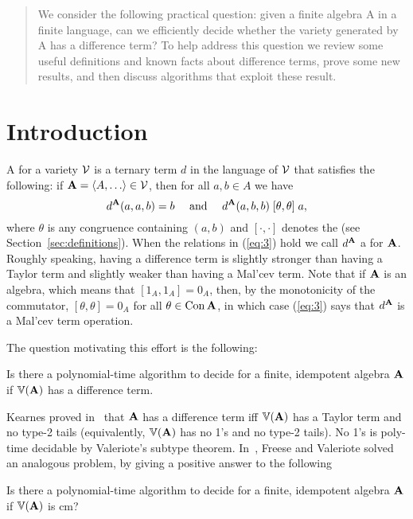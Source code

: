 \begin{abstract}
We consider the following practical question: given a finite algebra A in a
finite language, can we efficiently decide whether the variety generated by A
has a difference term? To help address this question we review some useful definitions
and known facts about difference terms, prove some new results, and then
discuss algorithms that exploit these result. 
\end{abstract}

\section{Introduction}
\label{sec:introduction}

A  for a variety $\mathcal{V}$ is a ternary term $d$ in the
language of $\mathcal{V}$ that satisfies the following:
if $\bA = \<A, \dots \> \in \sV$, then for all $a, b \in A$ we have
\begin{equation}
\label{eq:3}  
d^{\mathbf{A}}(a,a,b) = b \quad \text{ and } \quad
d^{\mathbf{A}}(a,b,b) \mathrel{[\theta, \theta]} a,
\end{equation}
where $\theta$ is any congruence %
containing $(a,b)$
and $[\cdot, \cdot]$ denotes the 
(see Section~\ref{sec:definitions}). %
When the relations in (\ref{eq:3}) hold we call $d^{\mathbf{A}}$
a  for $\mathbf{A}$.
Roughly speaking, having a difference term is slightly stronger than having
a Taylor term and slightly weaker than having a Mal'cev term.  Note that if
$\mathbf{A}$ is an  algebra, which means that $[1_A, 1_A] = 0_A$, then, by
the monotonicity of the commutator,
$[\theta, \theta] = 0_A$ for all $\theta \in \operatorname{Con} \mathbf{A}$, in which case
(\ref{eq:3}) says that $d^{\mathbf{A}}$ is a Mal'cev term operation.


The question motivating this effort is the following:
\begin{prob}
  \label{prob:1}
  Is there a polynomial-time algorithm to decide for a finite,
  idempotent algebra $\mathbf{A}$ if $\operatorname{\mathbb{V}}(\mathbf{A})$ has a difference term.
\end{prob}
Kearnes proved in~\cite{MR1358491} that $\mathbf{A}$ has a difference term iff
$\operatorname{\mathbb{V}}(\mathbf{A})$ has a Taylor term and no type-2 tails
(equivalently, $\operatorname{\mathbb{V}}(\mathbf{A})$ has no 1's and no type-2 tails).
No 1's is poly-time decidable by Valeriote's subtype theorem.
In~\cite{Freese:2009}, Freese and Valeriote solved an analogous problem, by
giving a positive answer to the following
\begin{prob}
  \label{prob:2}
  Is there a polynomial-time algorithm to decide for a finite,
  idempotent algebra $\mathbf{A}$ if $\operatorname{\mathbb{V}}(\mathbf{A})$ is \ac{cm}?
\end{prob}

